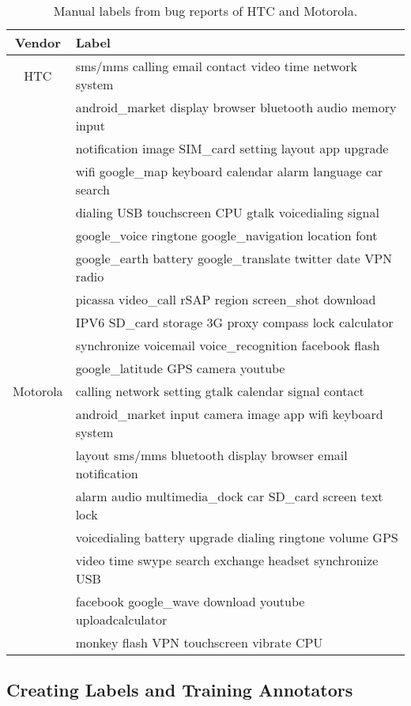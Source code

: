 \documentclass[10pt, conference, compsocconf]{IEEEtran}
\begin{document}
\begin{table}[!t]
\renewcommand{\arraystretch}{1.3}
\caption{Manual labels from bug reports of HTC and Motorola.}
\label{selected1}
\centering
\begin{tabular}{|c||l|}
\hline
Vendor & Label\\
\hline
HTC & sms\//mms calling email contact video time network system\\ 
  & android\_market display browser bluetooth audio memory input\\
  & notification image SIM\_card setting layout app upgrade\\
  & wifi google\_map keyboard calendar alarm language car search\\
  & dialing USB touchscreen CPU gtalk voicedialing signal\\
  & google\_voice ringtone google\_navigation location font\\
  & google\_earth battery google\_translate twitter date VPN radio\\
  & picassa video\_call rSAP region screen\_shot download\\
  & IPV6 SD\_card storage 3G proxy compass lock calculator\\
  & synchronize  voicemail  voice\_recognition facebook  flash\\
  & google\_latitude  GPS camera youtube\\
\hline
Motorola & calling network setting gtalk calendar signal contact\\
    & android\_market input camera image app wifi keyboard system\\
    & layout sms\//mms bluetooth display browser email notification\\
& alarm audio multimedia\_dock car SD\_card screen text lock\\
& voicedialing battery upgrade dialing ringtone volume GPS\\
& video time swype search exchange headset synchronize USB\\
& facebook google\_wave download youtube uploadcalculator\\
& monkey flash VPN touchscreen vibrate CPU\\
\hline
\end{tabular}
\end{table}


\subsection{Creating Labels and Training Annotators}
\end{document}
